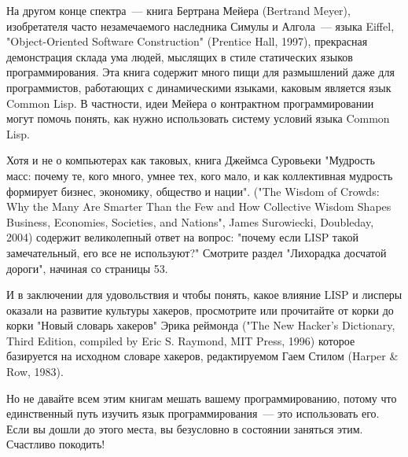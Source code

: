На другом конце спектра~--- книга Бертрана Мейера (Bertrand Meyer), изобретателя часто
незамечаемого наследника Симулы и Алгола~--- языка Eiffel, "Object-Oriented Software
Construction" (Prentice Hall, 1997), прекрасная демонстрация склада ума людей, мыслящих в
стиле статических языков программирования. Эта книга содержит много пищи для размышлений
даже для программистов, работающих с динамическими языками, каковым является язык Common
Lisp.  В частности, идеи Мейера о контрактном программировании могут помочь понять, как
нужно использовать систему условий языка Common Lisp.

Хотя и не о компьютерах как таковых, книга Джеймса Суровьеки "Мудрость масс: почему те,
кого много, умнее тех, кого мало, и как коллективная мудрость формирует бизнес, экономику,
общество и нации". ("The Wisdom of Crowds: Why the Many Are Smarter Than the Few and How
Collective Wisdom Shapes Business, Economies, Societies, and Nations", James Surowiecki,
Doubleday, 2004) содержит великолепный ответ на вопрос: "почему если LISP такой
замечательный, его все не используют?" Смотрите раздел "Лихорадка досчатой дороги",
начиная со страницы 53.

И в заключении для удовольствия и чтобы понять, какое влияние LISP и лисперы оказали на
развитие культуры хакеров, просмотрите или прочитайте от корки до корки "Новый словарь
хакеров" Эрика реймонда ("The New Hacker's Dictionary, Third Edition, compiled by Eric
S. Raymond, MIT Press, 1996) которое базируется на исходном словаре хакеров, редактируемом
Гаем Стилом (Harper \& Row, 1983).

Но не давайте всем этим книгам мешать вашему программированию, потому что единственный
путь изучить язык программирования~--- это использовать его. Если вы дошли до этого места,
вы безусловно в состоянии заняться этим.  Счастливо покодить!


